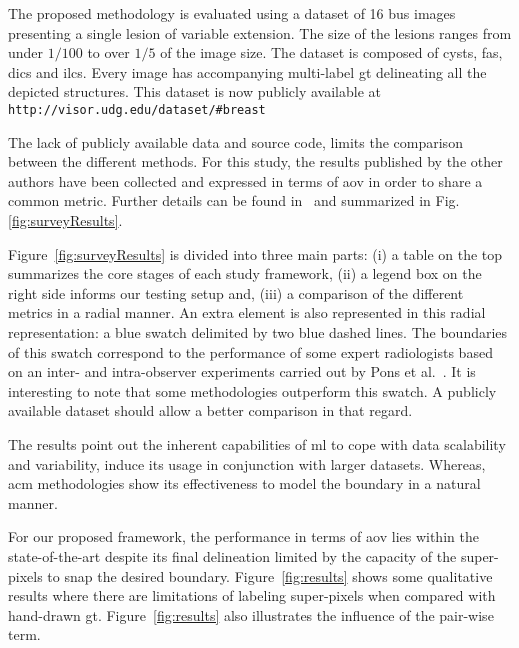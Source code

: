 The proposed methodology is evaluated using a dataset of 16 \ac{bus} images presenting a single lesion of variable extension.
The size of the lesions ranges from under $1/100$ to over $1/5$ of the image size.
The dataset is composed of cysts, \acp{fa}, \acp{dic} and \acp{ilc}.
Every image has accompanying multi-label \ac{gt} delineating all the depicted structures.
This dataset is now publicly available at \texttt{http://visor.udg.edu/dataset/\#breast}

The lack of publicly available data and source code, limits the comparison between the
different methods.
For this study, the results published by the other authors have been collected and expressed in terms of \ac{aov} in order to share a common metric.
Further details can be found in~\cite{massich2013phd} and summarized in Fig.\,\ref{fig:surveyResults}.

Figure~\ref{fig:surveyResults} is divided into three main parts: (i) a table on the top summarizes the core stages of each study framework, (ii) a legend box on the right side informs our testing setup and, (iii) a comparison of the different metrics in a radial manner. An extra element is also represented in this radial representation: a blue swatch delimited by two blue dashed lines. The boundaries of this swatch correspond to the performance of some expert radiologists based on an inter- and intra-observer experiments carried out by Pons et al.~\cite{gerard2013}.
It is interesting to note that some methodologies outperform this swatch.
A publicly available dataset should allow a better comparison in that regard.

The results point out the inherent capabilities of \ac{ml} to cope with data scalability and variability, induce its usage in conjunction with larger datasets.
Whereas, \ac{acm} methodologies show its effectiveness to model the boundary in a natural manner.

For our proposed framework, the performance in terms of \ac{aov} lies within the state-of-the-art despite its final delineation
limited by the capacity of the super-pixels to snap the desired boundary.
Figure~\ref{fig:results} shows some qualitative results where there are limitations of labeling super-pixels when compared with hand-drawn \ac{gt}.
Figure~\ref{fig:results} also illustrates the influence of the pair-wise term.

